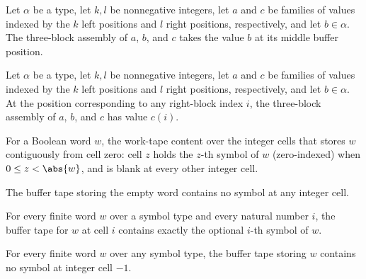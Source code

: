 \begin{lemma}
\label{Turing.FinTM.tapeBlocks_buffer}
\leanok
{}
Let $\alpha$ be a type, let $k,l$ be nonnegative integers, let $a$ and $c$ be families
of values indexed by the $k$ left positions and $l$ right positions, respectively, and
let $b\in\alpha$. The three-block assembly of $a$, $b$, and $c$ takes the value $b$ at
its middle buffer position.
\end{lemma}

\begin{lemma}
\label{Turing.FinTM.tapeBlocks_right}
\leanok
{}
Let $\alpha$ be a type, let $k,l$ be nonnegative integers, let $a$ and $c$ be families
of values indexed by the $k$ left positions and $l$ right positions, respectively, and
let $b\in\alpha$. At the position corresponding to any right-block index $i$, the
three-block assembly of $a$, $b$, and $c$ has value $c(i)$.
\end{lemma}

\begin{definition}
\label{Turing.FinTM.bufferTape}
\leanok
For a Boolean word $w$, the work-tape content over the integer cells that
stores $w$ contiguously from cell zero: cell $z$ holds the $z$-th symbol of
$w$ (zero-indexed) when $0 \le z < \abs{w}$, and is blank at every other
integer cell.
\end{definition}

\begin{lemma}
\label{Turing.FinTM.bufferTape_nil}
\leanok
{}
The buffer tape storing the empty word contains no symbol at any integer cell.
\end{lemma}

\begin{lemma}
\label{Turing.FinTM.bufferTape_nat}
\leanok
{}
For every finite word $w$ over a symbol type and every natural number $i$, the buffer
tape for $w$ at cell $i$ contains exactly the optional $i$-th symbol of $w$.
\end{lemma}

\begin{lemma}
\label{Turing.FinTM.bufferTape_left}
\leanok
{}
For every finite word $w$ over any symbol type, the buffer tape storing $w$ contains no
symbol at integer cell $-1$.
\end{lemma}

